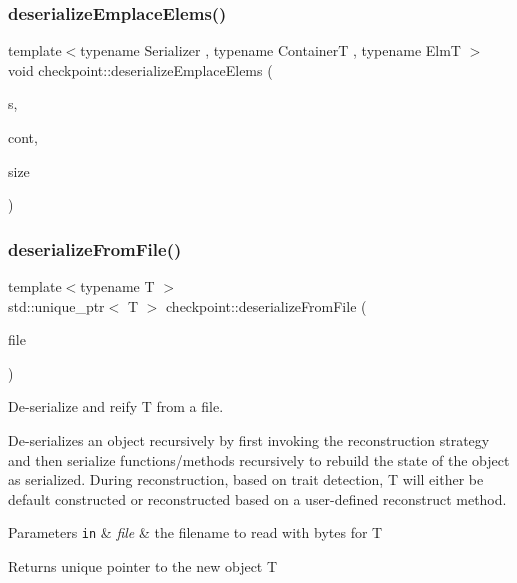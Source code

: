 \subsubsection{\texorpdfstring{deserialize\+Emplace\+Elems()}{deserializeEmplaceElems()}}
{\footnotesize\ttfamily template$<$typename Serializer , typename ContainerT , typename ElmT $>$ \\
void checkpoint\+::deserialize\+Emplace\+Elems (\begin{DoxyParamCaption}\item[{\hyperlink{structcheckpoint_1_1_serializer}{Serializer} \&}]{s,  }\item[{ContainerT \&}]{cont,  }\item[{typename Container\+T\+::size\+\_\+type}]{size }\end{DoxyParamCaption})\hspace{0.3cm}{\ttfamily [inline]}}

\mbox{\label{namespacecheckpoint_ad71bcfe197379c59aa16f737b7e2cf3e}} 
\subsubsection{\texorpdfstring{deserialize\+From\+File()}{deserializeFromFile()}}
{\footnotesize\ttfamily template$<$typename T $>$ \\
std\+::unique\+\_\+ptr$<$ T $>$ checkpoint\+::deserialize\+From\+File (\begin{DoxyParamCaption}\item[{std\+::string const \&}]{file }\end{DoxyParamCaption})}



De-\/serialize and reify {\ttfamily T} from a file. 

De-\/serializes an object recursively by first invoking the reconstruction strategy and then {\ttfamily serialize} functions/methods recursively to rebuild the state of the object as serialized. During reconstruction, based on trait detection, {\ttfamily T} will either be default constructed or reconstructed based on a user-\/defined reconstruct method.


\begin{DoxyParams}[1]{Parameters}
\mbox{\tt in}  & {\em file} & the filename to read with bytes for {\ttfamily T} \\
\hline
\end{DoxyParams}
\begin{DoxyReturn}{Returns}
unique pointer to the new object {\ttfamily T} 
\end{DoxyReturn}
\mbox{\label{namespacecheckpoint_af605968a3b8731448c68e5c9fff917ee}} 
